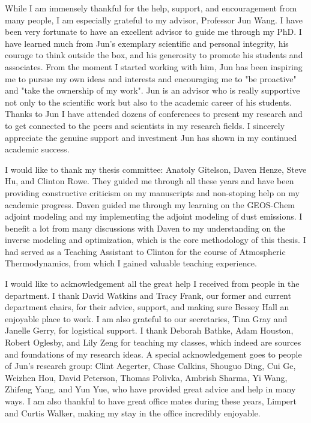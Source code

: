 \begin{acknowledgments}
While I am immensely thankful for the help, support, and encouragement
from many people, I am especially grateful to my advisor, Professor
Jun Wang. I have been very fortunate to have an excellent advisor 
to guide me through my PhD. I have learned much from Jun's exemplary 
scientific and personal integrity, his courage to think outside the box, 
and his generosity to promote his students and associates.
From the moment I started working with him, Jun has been inspiring me to
pursue my own ideas and interests and encouraging me to "be proactive"
and "take the ownership of my work". Jun is an advisor who is really
supportive not only to the scientific work but also to the academic
career of his students. Thanks to Jun I have attended dozens of 
conferences to present my research and to get connected to the peers and 
scientists in my research fields. I sincerely appreciate the genuine
support and investment Jun has shown in my continued academic success. 

I would like to thank my thesis committee: Anatoly Gitelson, Daven Henze, 
Steve Hu, and Clinton Rowe. They guided me through all these years and
have been providing constructive criticism on my manuscripts 
and non-stoping help on my academic progress. Daven guided me through 
my learning on the GEOS-Chem adjoint modeling and my
implementing the adjoint modeling of dust emissions. I benefit a lot from
many discussions with Daven to my understanding on the inverse modeling
and optimization, which is the core methodology of this thesis. I had
served as a Teaching Assistant to Clinton for the course of Atmospheric
Thermodynamics, from which I gained valuable teaching experience. 

I would like to acknowledgement all the great help I received from
people in the department. I thank David
Watkins and Tracy Frank, our former and current department chairs, for
their advice, support, and making sure Bessey Hall an enjoyable place to
work. I am also grateful to our secretaries, Tina Gray and Janelle Gerry, 
for logistical support. I thank Deborah Bathke, Adam Houston, 
Robert Oglesby, and Lily Zeng for teaching my classes, which indeed are 
sources and foundations of my research ideas. 
A special acknowledgement goes to people of
Jun's research group: Clint Aegerter, Chase Calkins, Shouguo Ding, Cui Ge, 
Weizhen Hou, David Peterson, Thomas Polivka, Ambrish Sharma, Yi Wang,
Zhifeng Yang, and Yun Yue, who have provided
great advice and help in many ways. I am also thankful to have great
office mates during these years, Limpert and Curtis Walker, making my
stay in the office incredibly enjoyable. 


\end{acknowledgments}
